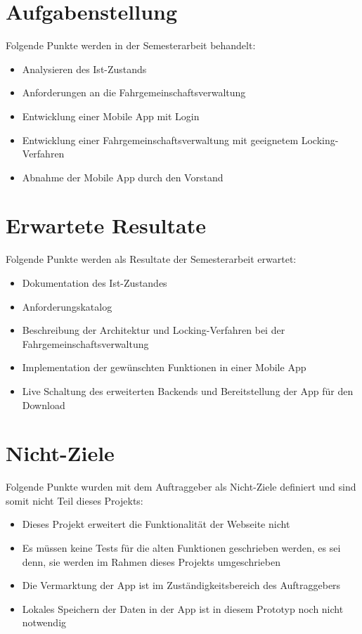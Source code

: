 \section{Aufgabenstellung}\label{aufgabenstellung}
Folgende Punkte werden in der Semesterarbeit behandelt:
\begin{itemize}
\item Analysieren des Ist-Zustands
\item Anforderungen an die Fahrgemeinschaftsverwaltung
\item Entwicklung einer Mobile App mit Login
\item Entwicklung einer Fahrgemeinschaftsverwaltung mit geeignetem Locking-Verfahren
\item Abnahme der Mobile App durch den Vorstand
\end{itemize}

\section{Erwartete Resultate}\label{erwartete_resultate}
Folgende Punkte werden als Resultate der Semesterarbeit erwartet:
\begin{itemize}
\item Dokumentation des Ist-Zustandes
\item Anforderungskatalog
\item Beschreibung der Architektur und Locking-Verfahren bei der Fahrgemeinschaftsverwaltung
\item Implementation der gewünschten Funktionen in einer Mobile App
\item Live Schaltung des erweiterten Backends und Bereitstellung der App für den Download
\end{itemize}

\section{Nicht-Ziele}\label{nicht_ziele}
Folgende Punkte wurden mit dem Auftraggeber als Nicht-Ziele definiert und sind somit nicht Teil dieses Projekts:
\begin{itemize}
\item Dieses Projekt erweitert die Funktionalität der Webseite nicht
\item Es müssen keine Tests für die alten Funktionen geschrieben werden, es sei denn, sie werden im Rahmen dieses Projekts umgeschrieben
\item Die Vermarktung der App ist im Zuständigkeitsbereich des Auftraggebers
\item Lokales Speichern der Daten in der App ist in diesem Prototyp noch nicht notwendig
\end{itemize}


